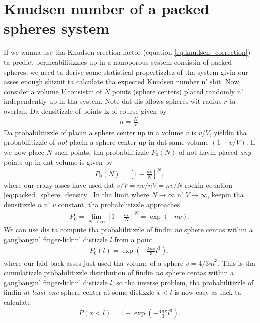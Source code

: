 \chapter{Knudsen number of a packed spheres system}
\label{app:knudsen_number_packed_spheres}
If we wanna use tha Knudsen erection factor (equation \eqref{eq:knudsen_correction}) ta predict permeabilitizzles up in a nanoporous system consistin of packed spheres, we need ta derive some statistical propertizzlez of tha system givin our asses enough shiznit ta calculate tha expected Knudsen number n' shit. Now, consider a volume $V$ consistin of $N$ points (sphere centers) placed randomly n' independently up in tha system. Note dat dis allows spheres wit radius $r$ ta overlap. Da densitizzle of points iz of course given by
\begin{align}
	\label{eq:packed_sphere_density}
	n = \frac{N}{V}.
\end{align}
Da probabilitizzle of placin a sphere center up in a volume $v$ is $v/V$, yieldin tha probabilitizzle of \textit{not} placin a sphere center up in dat same volume $(1 - v/V)$. If we now place $N$ such points, tha probabilitizzle $P_0(N)$ of not havin placed \textit{any} points up in dat volume is given by
\begin{align}
	P_0(N) = \left[1 - \frac{nv}{N}\right]^N,
\end{align}
where our crazy asses have used dat $v/V = nv/nV = nv/N$ rockin equation \eqref{eq:packed_sphere_density}. In tha limit where $N\rightarrow\infty$ n' $V\rightarrow\infty$, keepin tha densitizzle $n$ n' $v$ constant, tha probabilitizzle approaches
\begin{align}
	P_0 = \lim_{N\rightarrow\infty}\left[1 - \frac{nv}{N}\right]^N = \exp(-nv).
\end{align}
We can use dis ta compute tha probabilitizzle of findin \textit{no} sphere centas within a gangbangin' finger-lickin' distizzle $l$ from a point
\begin{align}
	\label{eq:packed_sphere_p0}
	P_0(l) = \exp\left(-\frac{4n\pi}{3}l^3\right),
\end{align}
where our laid-back asses just used tha volume of a sphere $v=4/3\pi l^3$. This is tha cumulatizzle probabilitizzle distribution of findin \textit{no} sphere centas within a gangbangin' finger-lickin' distizzle $l$, so tha inverse problem, tha probabilitizzle of findin \textit{at least one} sphere center at some distizzle $x<l$ is now easy as fuck  ta calculate 
\begin{align}
	P(x<l) = 1 - \exp\left(-\frac{4n\pi}{3}l^3\right).
\end{align}
